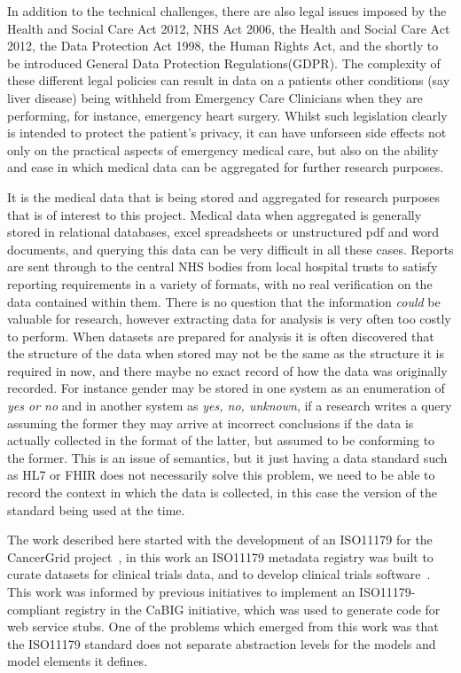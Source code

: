\documentclass{llncs}
\begin{document}
	In addition to the technical challenges, there are also legal issues imposed by the Health and Social Care Act 2012, NHS Act 2006, the Health and Social Care Act 2012, the Data Protection Act 1998, the Human Rights Act, and the shortly to be introduced General Data Protection Regulations(GDPR).  The complexity of these different legal policies can result in data on a patients other conditions (say liver disease) being withheld from Emergency Care Clinicians when they are performing, for instance, emergency heart surgery. Whilst such legislation clearly is intended to protect the patient's privacy, it can have unforseen side effects not only on the practical aspects of emergency medical care, but also on the ability and ease in which medical data can be aggregated for further research purposes.
	
	It is the medical data that is being stored and aggregated for research purposes that is of interest to this project. Medical data when aggregated is generally stored in relational databases, excel spreadsheets or unstructured pdf and word documents, and querying this data can be very difficult in all these cases. Reports are sent through to the central NHS bodies from local hospital trusts to satisfy reporting requirements in a variety of formats, with no real verification on the data contained within them. There is no question that the information \emph{could} be valuable for research, however extracting data for analysis is very often too costly to perform.  When datasets are prepared for analysis it is often discovered that the structure of the data when stored may not be the same as the structure it is required in now, and there maybe no exact record of how the data was originally recorded. For instance gender may be stored in one system as an enumeration of \emph{yes or no} and in another system as \emph{yes, no, unknown}, if a research writes a query assuming the former they may arrive at incorrect conclusions if the data is actually collected in the format of the latter, but assumed to be conforming to the former. This is an issue of semantics, but it just having a data standard such as HL7 or FHIR does not necessarily solve this problem, we need to be able to record the context in which the data is collected, in this case the version of the standard being used at the time.
	
	The work described here started with the development of an ISO11179 for the CancerGrid project~\cite{davi14}, in this work an ISO11179 metadata registry was built to curate datasets for clinical trials data, and to develop clinical trials software~\cite{davi12}. This work was informed by previous initiatives to implement an ISO11179-compliant registry in the CaBIG initiative, which was used to generate code for web service stubs. One of the problems which emerged from this work was that the ISO11179 standard does not separate abstraction levels for the models and model elements it defines.
	
\end{document}
